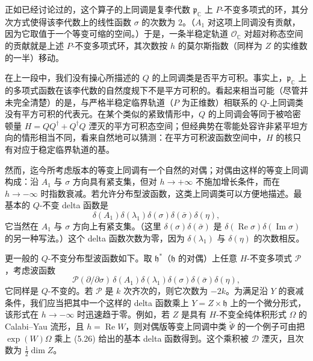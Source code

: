 \documentclass[11pt,a4paper,UTF8]{ctexart}
\theoremstyle{plain}
\theoremstyle{definition}
\begin{document}

正如已经讨论过的，这个算子的上同调是复李代数 $\mathfrak p_{\mathbb C}$ 上 $P$-不变多项式的环，其分次方式使得该李代数上的线性函数 $\sigma$ 的次数为 $2$。（$A_1$ 对这项上同调没有贡献，因为它取值于一个等变可缩的空间。）于是，一条半稳定轨道 $\mathcal O_{\mathbb C}$ 对超对称态空间的贡献就是上述 $P$-不变多项式环，其次数按 $h$ 的莫尔斯指数（同样为 $Z$ 的实维数的一半）移动。

在上一段中，我们没有操心所描述的 $Q$ 的上同调类是否平方可积。事实上，$\mathfrak p_{\mathbb C}$ 上的多项式函数在该李代数的自然度规下不是平方可积的。看起来相当可能（尽管并未完全清楚）的是，与严格半稳定临界轨道（$P$ 为正维数）相联系的 $Q$-上同调类没有平方可积的代表元。在某个类似的紧致情形中，$Q$ 的上同调会等同于被哈密顿量 $H=QQ^\dagger+Q^\dagger Q$ 湮灭的平方可积态空间；但经典势在零能处容许非紧平坦方向的情形相当不同，看来自然地可以猜测：在平方可积波函数空间中，$H$ 的核只有对应于稳定临界轨道的基。


然而，迄今所考虑版本的等变上同调有一个自然的对偶；对偶由这样的等变上同调构成：沿 $A_1$ 与 $\sigma$ 方向具有紧支集，但对 $h\to+\infty$ 不施加增长条件，而在 $h\to-\infty$ 时指数衰减。若允许分布型波函数，这类上同调类可以方便地描述。最基本的 $Q$-不变 delta 函数是
\begin{equation}
    \delta(A_1)\delta(\lambda_1)\delta(\sigma)\delta(\bar\sigma)\delta(\eta),
    \tag{5.26}
\end{equation}
它当然在 $A_1$ 与 $\sigma$ 方向上有紧支集。（这里 $\delta(\sigma)\delta(\bar\sigma)$ 是 $\delta(\operatorname{Re}\sigma)\delta(\operatorname{Im}\sigma)$ 的另一种写法。）这个 delta 函数次数为零，因为 $\delta(\lambda_1)$ 与 $\delta(\eta)$ 的次数相反。

更一般的 $Q$-不变分布型波函数如下。取 $\mathfrak h^*$（$\mathfrak h$ 的对偶）上任意 $H$-不变多项式 $\mathcal P$，考虑波函数
\begin{equation}
    \mathcal P(\partial/\partial\sigma)\,\delta(A_1)\delta(\lambda_1)\delta(\sigma)\delta(\bar\sigma)\delta(\eta),
    \tag{5.27}
\end{equation}
它同样是 $Q$-不变的。若 $\mathcal P$ 是 $k$ 次齐次的，则它次数为 $-2k$。为满足沿 $Y$ 的衰减条件，我们应当把其中一个这样的 delta 函数乘上 $Y=Z\times\mathfrak h$ 上的一个微分形式，该形式在 $h\to-\infty$ 时迅速趋于零。例如，若 $Z$ 是具有 $H$-不变全纯体积形式 $\Omega$ 的 Calabi–Yau 流形，且 $h=\operatorname{Re}W$，则对偶版等变上同调中类 $\tilde\Psi$ 的一个例子可由把 $\exp(W)\Omega$ 乘上 (5.26) 给出的基本 delta 函数得到。这个乘积被 $\mathcal D$ 湮灭，且次数为 $\frac12\dim Z$。
\end{document}
